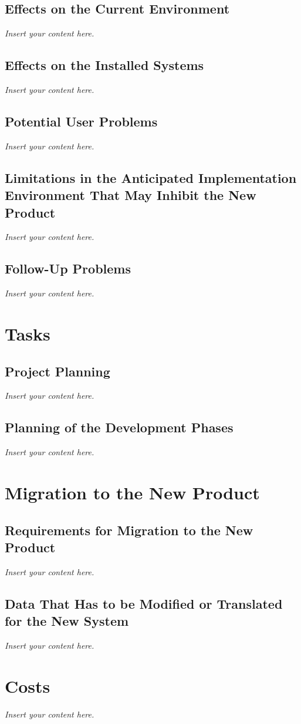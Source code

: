 \documentclass[12pt]{article}
\newcommand{\lips}{\textit{Insert your content here.}}
\begin{document}
\subsection{Effects on the Current Environment}
\lips
\subsection{Effects on the Installed Systems}
\lips
\subsection{Potential User Problems}
\lips
\subsection{Limitations in the Anticipated Implementation Environment That May
Inhibit the New Product}
\lips
\subsection{Follow-Up Problems}
\lips

\section{Tasks}
\subsection{Project Planning}
\lips
\subsection{Planning of the Development Phases}
\lips

\section{Migration to the New Product}
\subsection{Requirements for Migration to the New Product}
\lips
\subsection{Data That Has to be Modified or Translated for the New System}
\lips

\section{Costs}
\lips
\end{document}
